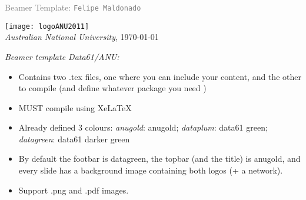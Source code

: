 

{%

\begin{frame}[c]%

\begin{center}
	
	\vspace{10em}
	\footnotesize\textcolor{gray}{Beamer Template: 	\texttt{Felipe Maldonado}}
	\vspace{.5em}
	
	\texttt{[image: logoANU2011]}\\
	\textcolor{anugold}{\textit{Australian National University}, \today} %

\end{center}
\end{frame}
}


\begin{frame}[c]{ \textit{Beamer template Data61/ANU:}}
\begin{itemize}
\item Contains two .tex files, one where you can include your content, and the other to compile (and define whatever package you need )
\item MUST compile using XeLaTeX
\item Already defined 3 colours: {\it anugold}: \textcolor{anugold}{anugold};   {\it dataplum}: \textcolor{dataplum}{data61 green};  {\it datagreen}: \textcolor{datagreen}{data61 darker green} 
\item By default the footbar is datagreen, the topbar (and the title) is anugold, and every slide has a background image containing both logos (+ a network). 
\item Support .png and .pdf images. 
\end{itemize}
\end{frame}

